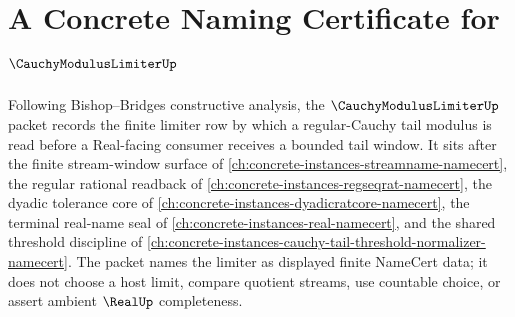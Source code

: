 \chapter{A Concrete Naming Certificate for $\CauchyModulusLimiterUp$}
\label{ch:concrete-instances-cauchy-modulus-limiter-namecert}

Following Bishop--Bridges constructive analysis, the $\CauchyModulusLimiterUp$ packet records the finite limiter row by which a regular-Cauchy tail modulus is read before a Real-facing consumer receives a bounded tail window. It sits after the finite stream-window surface of \autoref{ch:concrete-instances-streamname-namecert}, the regular rational readback of \autoref{ch:concrete-instances-regseqrat-namecert}, the dyadic tolerance core of \autoref{ch:concrete-instances-dyadicratcore-namecert}, the terminal real-name seal of \autoref{ch:concrete-instances-real-namecert}, and the shared threshold discipline of \autoref{ch:concrete-instances-cauchy-tail-threshold-normalizer-namecert}. The packet names the limiter as displayed finite NameCert data; it does not choose a host limit, compare quotient streams, use countable choice, or assert ambient $\RealUp$ completeness.

